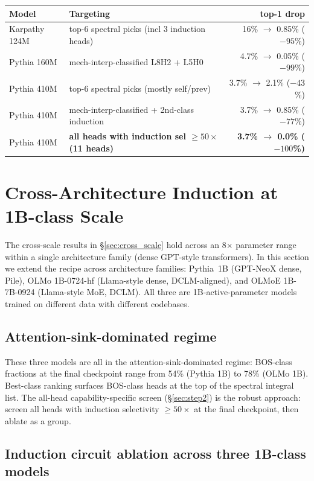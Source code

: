 \documentclass[11pt]{article}
\begin{document}
\begin{center}
\small
\begin{tabular}{llr}
\toprule
Model & Targeting & top-1 drop \\
\midrule
Karpathy 124M & top-6 spectral picks (incl 3 induction heads) & 16\% $\to$ 0.85\% ($-95$\%) \\
Pythia 160M   & mech-interp-classified L8H2 + L5H0           & 4.7\% $\to$ 0.05\% ($-99$\%) \\
Pythia 410M   & top-6 spectral picks (mostly self/prev)      & 3.7\% $\to$ 2.1\% ($-43$\%) \\
Pythia 410M   & mech-interp-classified + 2nd-class induction & 3.7\% $\to$ 0.85\% ($-77$\%) \\
Pythia 410M   & \textbf{all heads with induction sel $\geq 50\times$ (11 heads)} & \textbf{3.7\% $\to$ 0.0\% ($-100$\%)} \\
\bottomrule
\end{tabular}
\end{center}

\section{Cross-Architecture Induction at 1B-class Scale}
\label{sec:cross_arch}

The cross-scale results in \S\ref{sec:cross_scale} hold across an 8$\times$ parameter range within a single architecture family (dense GPT-style transformers). In this section we extend the recipe across architecture families: Pythia~1B (GPT-NeoX dense, Pile), OLMo 1B-0724-hf (Llama-style dense, DCLM-aligned), and OLMoE 1B-7B-0924 (Llama-style MoE, DCLM). All three are 1B-active-parameter models trained on different data with different codebases.

\subsection{Attention-sink-dominated regime}

These three models are all in the attention-sink-dominated regime: BOS-class fractions at the final checkpoint range from 54\% (Pythia 1B) to 78\% (OLMo 1B). Best-class ranking surfaces BOS-class heads at the top of the spectral integral list. The all-head capability-specific screen (\S\ref{sec:step2}) is the robust approach: screen all heads with induction selectivity $\geq 50\times$ at the final checkpoint, then ablate as a group.

\subsection{Induction circuit ablation across three 1B-class models}
\end{document}
